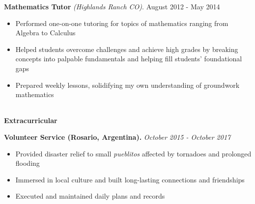 \documentclass[letterpaper,11pt]{article}
\begin{document}
\textbf{Mathematics Tutor} \textit{(Highlands Ranch CO)}. \hfill August 2012 - May 2014
\begin{itemize}[noitemsep,topsep=0pt]
	\item Performed one-on-one tutoring for topics of mathematics ranging from Algebra to Calculus
	\item Helped students overcome challenges and achieve high grades by breaking concepts into palpable fundamentals and helping fill students' foundational gaps
	\item Prepared weekly lessons, solidifying my own understanding of groundwork mathematics\\
\end{itemize}




\begin{Large}\textbf{\\Extracurricular}\end{Large}

\textbf{Volunteer Service (Rosario, Argentina).} \textit{October 2015 - October 2017}
\begin{itemize}[noitemsep,topsep=0pt]
	\item Provided disaster relief to small \textit{pueblitos} affected by tornadoes and prolonged flooding
	\item Immersed in local culture and built long-lasting connections and friendships
	\item Executed and maintained daily plans and records\\
\end{itemize}
\end{document}
